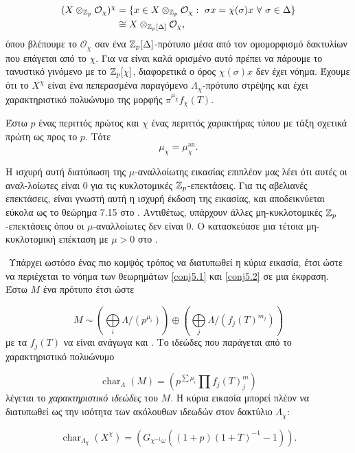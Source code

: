 \begin{align*}
    (X\otimes_{\mathbb{Z}_p}\mathcal{O}_\chi)^\chi &= \{x \in X \otimes_{\mathbb{Z}_p} \mathcal{O}_\chi: \ \sigma x = \chi (\sigma) x \ \forall \ \sigma \in \Delta\} \\
    &\cong X \otimes_{\mathbb{Z}_p[\Delta]} \mathcal{O}_\chi,
\end{align*} όπου βλέπουμε το $\mathcal{O}_\chi$ σαν ένα $\mathbb{Z}_p[\Delta]$-πρότυπο μέσα από τον ομομορφισμό δακτυλίων που επάγεται από το $\chi$. Για να είναι καλά ορισμένο αυτό πρέπει να πάρουμε το τανυστικό γινόμενο με το $\mathbb{Z}_p[\chi]$, διαφορετικά ο όρος $\chi(\sigma)x$ δεν έχει νόημα. Έχουμε ότι το $X^\chi$ είναι ένα πεπερασμένα παραγόμενο $\Lambda_\chi$-πρότυπο στρέψης και έχει χαρακτηριστικό πολυώνυμο της μορφής $\pi^{\mu_\chi} f_\chi(T)$.

\begin{theorem}\label{conj5.2}
    Έστω $p$ ένας περιττός πρώτος και $\chi$ ένας περιττός χαρακτήρας τύπου  με τάξη σχετικά πρώτη ως προς το $p$. Τότε 
    $$\mu_\chi = \mu^{\operatorname{an}}_\chi .$$
\end{theorem}

\noindent Η ισχυρή αυτή διατύπωση της $\mu$-αναλλοίωτης εικασίας επιπλέον μας λέει ότι αυτές οι αναλ-λοίωτες είναι $0$ για τις 
κυκλοτομικές $\mathbb{Z}_p$-επεκτάσεις. Για τις αβελιανές επεκτάσεις, είναι γνωστή αυτή η ισχυρή έκδοση της εικασίας, 
και αποδεικνύεται εύκολα ως το θεώρημα 7.15 στο \cite{Wash}. Αντιθέτως, υπάρχουν άλλες μη-κυκλοτομικές $\mathbb{Z}_p$-επεκτάσεις όπου οι $\mu$-αναλλοίωτες δεν είναι $0$. 
Ο  κατασκεύασε μια τέτοια μη-κυκλοτομική επέκταση με $\mu >0$ στο \cite{Iwa1}.

$ $\newline
Υπάρχει ωστόσο ένας πιο κομψός τρόπος να διατυπωθεί η κύρια εικασία, έτσι ώστε να περιέχεται το νόημα των θεωρημάτων \ref{conj5.1} και \ref{conj5.2} σε μια έκφραση. Έστω $M$ ένα πρότυπο έτσι ώστε

$$M \sim \left(\bigoplus\limits_i \Lambda/(p^{\mu_i})\right) \oplus \left(\bigoplus\limits_j \Lambda/(f_j(T)^{m_j})\right)$$ με τα $f_j(T)$ να είναι ανάγωγα και . Το ιδεώδες που παράγεται από το χαρακτηριστικό πολυώνυμο

$$\operatorname{char}_\Lambda(M) = \left( p^{\sum \mu_i} \prod f_j(T)^m_j\right)$$ λέγεται το {\em χαρακτηριστικό ιδεώδες} του $M$. 
Η κύρια εικασία μπορεί πλέον να διατυπωθεί ως την ισότητα των ακόλουθων ιδεωδών στον δακτύλιο $\Lambda_\chi$:

$$\operatorname{char}_{\Lambda_\chi}(X^\chi) = \left(G_{\chi^{-1}\omega} ((1+p)(1+T)^{-1}-1)\right).$$

